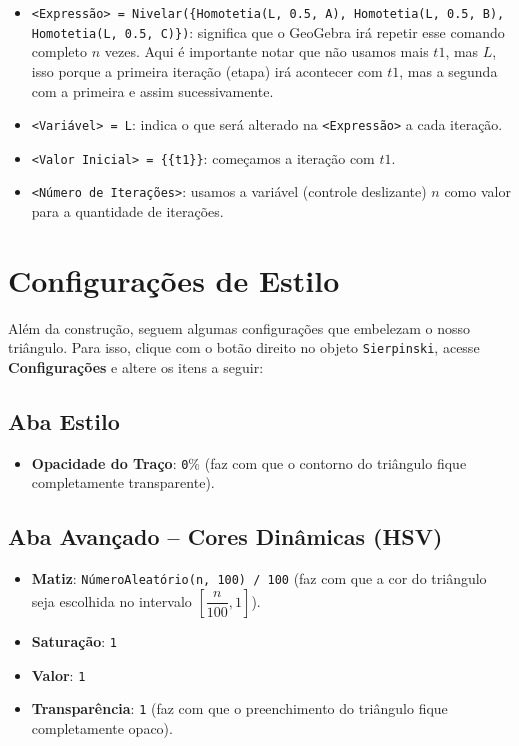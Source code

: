 \documentclass[12pt,a4paper]{report}
\begin{document}
	\begin{itemize}
		\item \texttt{<Expressão> = Nivelar(\{Homotetia(L, 0.5, A), Homotetia(L, 0.5, B), Homotetia(L, 0.5, C)\})}: significa que o GeoGebra irá repetir esse comando completo $n$ vezes. Aqui é importante notar que não usamos mais $t1$, mas $L$, isso porque a primeira iteração (etapa) irá acontecer com $t1$, mas a segunda com a primeira e assim sucessivamente.
		\item \texttt{<Variável> = L}: indica o que será alterado na \texttt{<Expressão>} a cada iteração. 
		\item \texttt{<Valor Inicial> = \{\{t1\}\}}: começamos a iteração com $t1$.
		\item \texttt{<Número de Iterações>}: usamos a variável (controle deslizante) $n$ como valor para a quantidade de iterações.
	\end{itemize}
	
	\section{Configurações de Estilo}
	
	Além da construção, seguem algumas configurações que embelezam o nosso triângulo. Para isso, clique com o botão direito no objeto \texttt{Sierpinski}, acesse \textbf{Configurações} e altere os itens a seguir:
	
	\subsection{Aba Estilo}
	
	\begin{itemize}
		\item \textbf{Opacidade do Traço}: \texttt{0}\% (faz com que o contorno do triângulo fique completamente transparente).
	\end{itemize}		
	
	\subsection{Aba Avançado -- Cores Dinâmicas (HSV)}
	
	\begin{itemize}
		\item \textbf{Matiz}: \texttt{NúmeroAleatório(n, 100) / 100} (faz com que a cor do triângulo seja escolhida no intervalo $\left[\dfrac{n}{100}, 1\right]$).
		\item \textbf{Saturação}: \texttt{1}
		\item \textbf{Valor}: \texttt{1}
		\item \textbf{Transparência}: \texttt{1} (faz com que o preenchimento do triângulo fique completamente opaco).
	\end{itemize}
	
\end{document}
